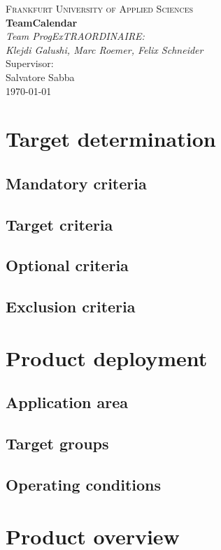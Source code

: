 \documentclass[]{article}
\begin{document}
	\begin{titlepage}
		\centering
		\vspace*{0cm}
		{\scshape\Large Frankfurt University of Applied Sciences}\\[3cm]
		{\huge\bfseries TeamCalendar}\\[8cm]
		{\Large\itshape Team ProgExTRAORDINAIRE:}\\
		{\Large\itshape Klejdi Galushi, Marc Roemer, Felix Schneider}\\[3cm]
		Supervisor:\\
		Salvatore Sabba\\[1cm]
		{\large \today}
	\end{titlepage}
	\newpage
	\tableofcontents
	\newpage
	
\section{Target determination}
	\subsection{Mandatory criteria}
	\subsection{Target criteria}
	\subsection{Optional criteria}
	\subsection{Exclusion criteria}
\section{Product deployment}
	\subsection{Application area}
	\subsection{Target groups}
	\subsection{Operating conditions}
\section{Product overview}
\end{document}
